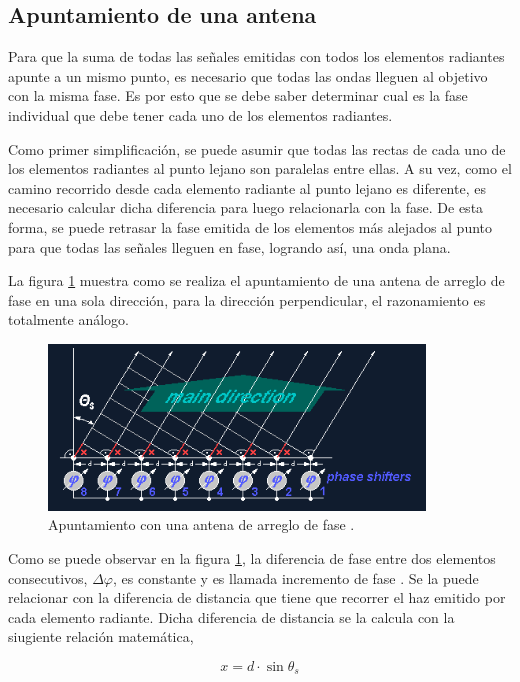 \subsection{Apuntamiento de una antena}

Para que la suma de todas las señales emitidas con todos los elementos radiantes apunte a un mismo punto, es necesario que 
todas las ondas lleguen al objetivo con la misma fase. Es por esto que se debe saber determinar cual es la fase individual que 
debe tener cada uno de los elementos radiantes. 

Como primer simplificación, se puede asumir que todas las rectas de cada uno de los elementos radiantes al punto lejano son 
paralelas entre ellas. A su vez, como el camino recorrido desde cada elemento radiante al punto lejano es diferente, es 
necesario calcular dicha diferencia para luego relacionarla con la fase. De esta forma, se puede retrasar la fase emitida de 
los elementos más alejados al punto para que todas las señales lleguen en fase, logrando así, una onda plana.

La figura \ref{fig:beamSteering} muestra como se realiza el apuntamiento de una antena de arreglo de fase en una sola dirección,
para la dirección perpendicular, el razonamiento es totalmente análogo.

\begin{figure}[H]
 \centering
 \includegraphics[width=10cm]{gfx/beamSteering.png}
 \caption{Apuntamiento con una antena de arreglo de fase \cite{BeamSteering}.}
 \label{fig:beamSteering}
\end{figure}

Como se puede observar en la figura \ref{fig:beamSteering}, la diferencia de fase entre dos elementos consecutivos, 
$\Delta\varphi$, es constante y es llamada incremento de fase \cite{BeamSteering}. Se la puede relacionar con la diferencia 
de distancia que tiene que recorrer el haz emitido por cada elemento radiante. Dicha diferencia de distancia se la calcula con 
la siugiente relación matemática, 


\begin{equation}
	x = d\cdot \sin{\theta_s}
	\label{eq:steering}
\end{equation}

